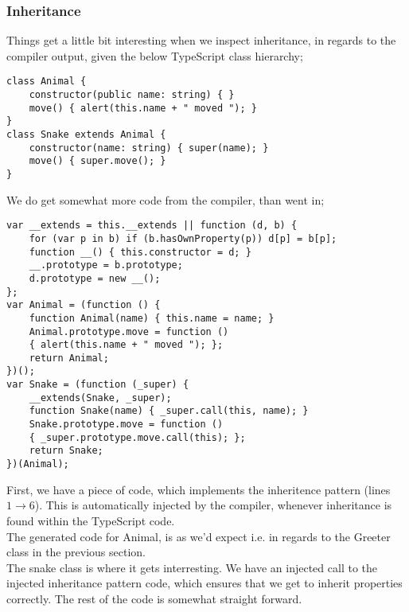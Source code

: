 \subsubsection*{Inheritance}
Things get a little bit interesting when we inspect inheritance, in regards to the compiler output, given the below TypeScript class hierarchy;
\begin{verbatim}
class Animal {
    constructor(public name: string) { }
    move() { alert(this.name + " moved "); }
}
class Snake extends Animal {
    constructor(name: string) { super(name); }
    move() { super.move(); }
}
\end{verbatim}
We do get somewhat more code from the compiler, than went in;
\begin{verbatim}
var __extends = this.__extends || function (d, b) {
    for (var p in b) if (b.hasOwnProperty(p)) d[p] = b[p];
    function __() { this.constructor = d; }
    __.prototype = b.prototype;
    d.prototype = new __();
};
var Animal = (function () {
    function Animal(name) { this.name = name; }
    Animal.prototype.move = function ()
    { alert(this.name + " moved "); };
    return Animal;
})();
var Snake = (function (_super) {
    __extends(Snake, _super);
    function Snake(name) { _super.call(this, name); }
    Snake.prototype.move = function ()
    { _super.prototype.move.call(this); };
    return Snake;
})(Animal);
\end{verbatim}
First, we have a piece of code, which implements the inheritence pattern (lines $1\rightarrow6$).
This is automatically injected by the compiler, whenever inheritance is found within the TypeScript code.
\\
The generated code for Animal, is as we'd expect i.e. in regards to the Greeter class in the previous section.
\\
The snake class is where it gets interresting. We have an injected call to the injected inheritance pattern code, which ensures that we get to inherit properties correctly.
The rest of the code is somewhat straight forward.

